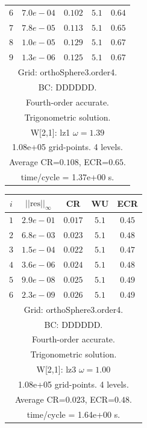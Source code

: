 \begin{table}[hbt]
\begin{center}
{\begin{tabular}{|c|c|c|c|c|}
 $ 6$  & $ 7.0e-04$ & $0.102$ & $ 5.1$ & $0.64$ \\ 
 $ 7$  & $ 7.8e-05$ & $0.113$ & $ 5.1$ & $0.65$ \\ 
 $ 8$  & $ 1.0e-05$ & $0.129$ & $ 5.1$ & $0.67$ \\ 
 $ 9$  & $ 1.3e-06$ & $0.125$ & $ 5.1$ & $0.67$ \\ 
\hline 
\multicolumn{5}{|c|}{Grid: orthoSphere3.order4.}  \\
\multicolumn{5}{|c|}{BC: DDDDDD.}  \\
\multicolumn{5}{|c|}{Fourth-order accurate.}  \\
\multicolumn{5}{|c|}{Trigonometric solution.}  \\
\multicolumn{5}{|c|}{W[2,1]: lz1 $\omega=1.39$}  \\
\multicolumn{5}{|c|}{1.08e+05 grid-points. 4 levels.}  \\
\multicolumn{5}{|c|}{Average CR=$0.108$, ECR=$0.65$.}  \\
\multicolumn{5}{|c|}{time/cycle = 1.37e+00 s.}  \\
\hline 
\end{tabular}
\begin{tabular}{|c|c|c|c|c|} \hline 
 $i$   & $\vert\vert\mbox{res}\vert\vert_\infty$  &  CR     &  WU    & ECR  \\   \hline 
 $ 1$  & $ 2.9e-01$ & $0.017$ & $ 5.1$ & $0.45$ \\ 
 $ 2$  & $ 6.8e-03$ & $0.023$ & $ 5.1$ & $0.48$ \\ 
 $ 3$  & $ 1.5e-04$ & $0.022$ & $ 5.1$ & $0.47$ \\ 
 $ 4$  & $ 3.6e-06$ & $0.024$ & $ 5.1$ & $0.48$ \\ 
 $ 5$  & $ 9.0e-08$ & $0.025$ & $ 5.1$ & $0.49$ \\ 
 $ 6$  & $ 2.3e-09$ & $0.026$ & $ 5.1$ & $0.49$ \\ 
\hline 
\multicolumn{5}{|c|}{Grid: orthoSphere3.order4.}  \\
\multicolumn{5}{|c|}{BC: DDDDDD.}  \\
\multicolumn{5}{|c|}{Fourth-order accurate.}  \\
\multicolumn{5}{|c|}{Trigonometric solution.}  \\
\multicolumn{5}{|c|}{W[2,1]: lz3 $\omega=1.00$}  \\
\multicolumn{5}{|c|}{1.08e+05 grid-points. 4 levels.}  \\
\multicolumn{5}{|c|}{Average CR=$0.023$, ECR=$0.48$.}  \\
\multicolumn{5}{|c|}{time/cycle = 1.64e+00 s.}  \\

\end{tabular}}
\end{center}
\end{table}

